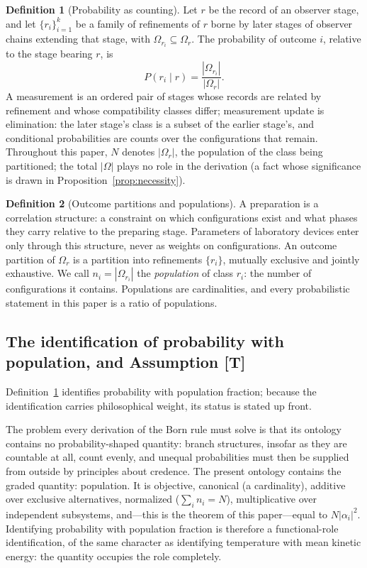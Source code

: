 \documentclass[11pt]{article}
\theoremstyle{definition}
\newtheorem{definition}{Definition}
\theoremstyle{remark}
\begin{document}
\begin{definition}[Probability as counting]\label{def:prob}
Let $r$ be the record of an observer stage, and let $\{r_i\}_{i=1}^{k}$ be a family of refinements of $r$ borne by later stages of observer chains extending that stage, with $\Omega_{r_i} \subseteq \Omega_r$. The probability of outcome $i$, relative to the stage bearing $r$, is
\begin{equation}
P(r_i \mid r) = \frac{|\Omega_{r_i}|}{|\Omega_r|}.
\end{equation}
A measurement is an ordered pair of stages whose records are related by refinement and whose compatibility classes differ; measurement update is elimination: the later stage's class is a subset of the earlier stage's, and conditional probabilities are counts over the configurations that remain. Throughout this paper, $N$ denotes $|\Omega_r|$, the population of the class being partitioned; the total $|\Omega|$ plays no role in the derivation (a fact whose significance is drawn in Proposition~\ref{prop:necessity}).
\end{definition}

\begin{definition}[Outcome partitions and populations]\label{def:partition}
A preparation is a correlation structure: a constraint on which configurations exist and what phases they carry relative to the preparing stage. Parameters of laboratory devices enter only through this structure, never as weights on configurations. An outcome partition of $\Omega_r$ is a partition into refinements $\{r_i\}$, mutually exclusive and jointly exhaustive. We call $n_i = |\Omega_{r_i}|$ the \emph{population} of class $r_i$: the number of configurations it contains. Populations are cardinalities, and every probabilistic statement in this paper is a ratio of populations.
\end{definition}

\subsection{The identification of probability with population, and Assumption [T]}\label{sec:ident}
Definition~\ref{def:prob} identifies probability with population fraction; because the identification carries philosophical weight, its status is stated up front.

The problem every derivation of the Born rule must solve is that its ontology contains no probability-shaped quantity: branch structures, insofar as they are countable at all, count evenly, and unequal probabilities must then be supplied from outside by principles about credence. The present ontology contains the graded quantity: population. It is objective, canonical (a cardinality), additive over exclusive alternatives, normalized ($\sum_i n_i = N$), multiplicative over independent subsystems, and---this is the theorem of this paper---equal to $N|\alpha_i|^2$. Identifying probability with population fraction is therefore a functional-role identification, of the same character as identifying temperature with mean kinetic energy: the quantity occupies the role completely.
\end{document}
